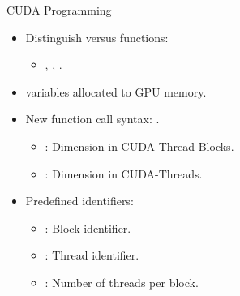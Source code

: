 \begin{frame}[t]{CUDA Programming}
\begin{itemize}
  \item Distinguish  versus  functions:
    \begin{itemize}
      \item {}, , .
    \end{itemize}

  \item {} variables allocated to GPU memory.

  \item New function call syntax: .
    \begin{itemize}
      \item {}: Dimension in CUDA-Thread Blocks.
      \item {}: Dimension in CUDA-Threads.
    \end{itemize}

  \item Predefined identifiers:
    \begin{itemize}
      \item {}: Block identifier.
      \item {}: Thread identifier.
      \item {}: Number of threads per block.
    \end{itemize}
  
\end{itemize}
\end{frame}

